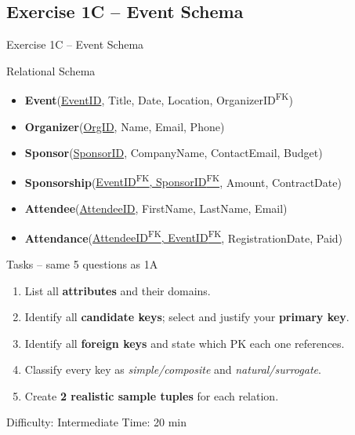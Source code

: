 \documentclass[10pt]{beamer}
\begin{document}
\subsection{Exercise 1C -- Event Schema}

\begin{frame}{Exercise 1C -- Event Schema}
  \begin{block}{Relational Schema}
    \small
    \begin{itemize}
      \item \textbf{Event}(\underline{EventID}, Title, Date, Location, OrganizerID\textsuperscript{FK})
      \item \textbf{Organizer}(\underline{OrgID}, Name, Email, Phone)
      \item \textbf{Sponsor}(\underline{SponsorID}, CompanyName, ContactEmail, Budget)
      \item \textbf{Sponsorship}(\underline{EventID\textsuperscript{FK}, SponsorID\textsuperscript{FK}}, Amount, ContractDate)
      \item \textbf{Attendee}(\underline{AttendeeID}, FirstName, LastName, Email)
      \item \textbf{Attendance}(\underline{AttendeeID\textsuperscript{FK}, EventID\textsuperscript{FK}}, RegistrationDate, Paid)
    \end{itemize}
  \end{block}

  \begin{block}{Tasks -- same 5 questions as 1A}
    \begin{enumerate}
      \item List all \textbf{attributes} and their domains.
      \item Identify all \textbf{candidate keys}; select and justify your \textbf{primary key}.
      \item Identify all \textbf{foreign keys} and state which PK each one references.
      \item Classify every key as \emph{simple/composite} and \emph{natural/surrogate}.
      \item Create \textbf{2 realistic sample tuples} for each relation.
    \end{enumerate}
  \end{block}

  \begin{alertblock}{Difficulty: Intermediate \quad Time: 20 min}
  \end{alertblock}
\end{frame}
\end{document}
